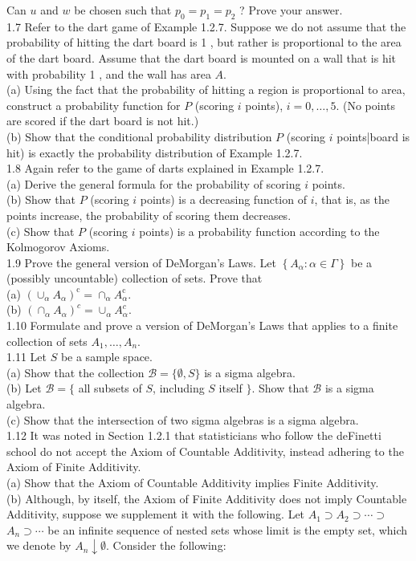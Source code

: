 \documentclass[10pt]{article}
\begin{document}
Can $u$ and $w$ be chosen such that $p_{0}=p_{1}=p_{2}$ ? Prove your answer.\\
1.7 Refer to the dart game of Example 1.2.7. Suppose we do not assume that the probability of hitting the dart board is 1 , but rather is proportional to the area of the dart board. Assume that the dart board is mounted on a wall that is hit with probability 1 , and the wall has area $A$.\\
(a) Using the fact that the probability of hitting a region is proportional to area, construct a probability function for $P$ (scoring $i$ points), $i=0, \ldots, 5$. (No points are scored if the dart board is not hit.)\\
(b) Show that the conditional probability distribution $P$ (scoring $i$ points|board is hit) is exactly the probability distribution of Example 1.2.7.\\
1.8 Again refer to the game of darts explained in Example 1.2.7.\\
(a) Derive the general formula for the probability of scoring $i$ points.\\
(b) Show that $P$ (scoring $i$ points) is a decreasing function of $i$, that is, as the points increase, the probability of scoring them decreases.\\
(c) Show that $P$ (scoring $i$ points) is a probability function according to the Kolmogorov Axioms.\\
1.9 Prove the general version of DeMorgan's Laws. Let $\left\{A_{\alpha}: \alpha \in \Gamma\right\}$ be a (possibly uncountable) collection of sets. Prove that\\
(a) $\left(\cup_{\alpha} A_{\alpha}\right)^{\mathrm{c}}=\cap_{\alpha} A_{\alpha}^{\mathrm{c}}$.\\
(b) $\left(\cap_{\alpha} A_{\alpha}\right)^{c}=\cup_{\alpha} A_{\alpha}^{c}$.\\
1.10 Formulate and prove a version of DeMorgan's Laws that applies to a finite collection of sets $A_{1}, \ldots, A_{n}$.\\
1.11 Let $S$ be a sample space.\\
(a) Show that the collection $\mathcal{B}=\{\emptyset, S\}$ is a sigma algebra.\\
(b) Let $\mathcal{B}=\{$ all subsets of $S$, including $S$ itself $\}$. Show that $\mathcal{B}$ is a sigma algebra.\\
(c) Show that the intersection of two sigma algebras is a sigma algebra.\\
1.12 It was noted in Section 1.2.1 that statisticians who follow the deFinetti school do not accept the Axiom of Countable Additivity, instead adhering to the Axiom of Finite Additivity.\\
(a) Show that the Axiom of Countable Additivity implies Finite Additivity.\\
(b) Although, by itself, the Axiom of Finite Additivity does not imply Countable Additivity, suppose we supplement it with the following. Let $A_{1} \supset A_{2} \supset \cdots \supset$ $A_{n} \supset \cdots$ be an infinite sequence of nested sets whose limit is the empty set, which we denote by $A_{n} \downarrow \emptyset$. Consider the following:
\end{document}
